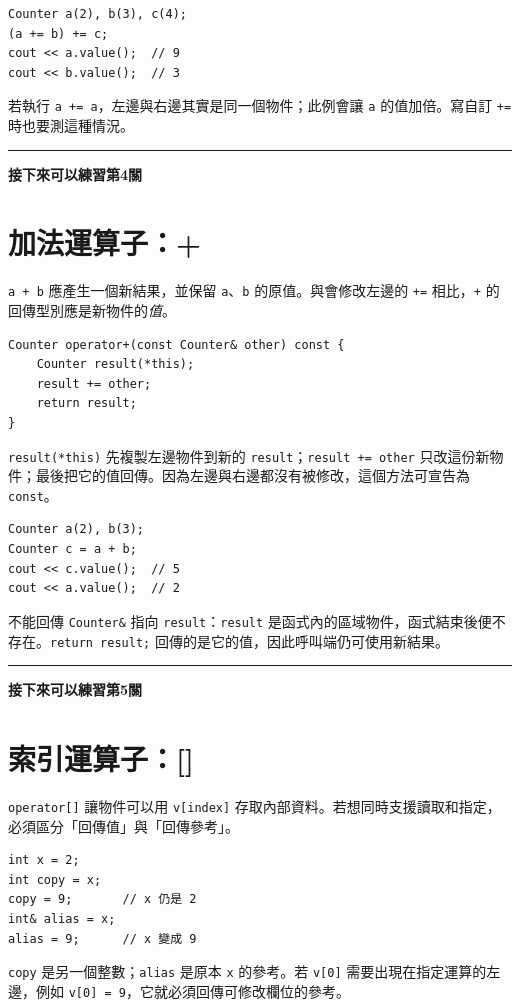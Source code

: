 \documentclass[12pt,a4paper]{article}
\newcommand{\practice}[1]{%
  \Needspace{3\baselineskip}%
  \par\vspace{0.6em}\noindent\rule{\linewidth}{0.3pt}\par
  \noindent\textbf{接下來可以練習第#1關}\par
}
\begin{document}
\begin{lstlisting}
Counter a(2), b(3), c(4);
(a += b) += c;
cout << a.value();  // 9
cout << b.value();  // 3
\end{lstlisting}

若執行 \texttt{a += a}，左邊與右邊其實是同一個物件；此例會讓 \texttt{a} 的值加倍。寫自訂 \texttt{+=} 時也要測這種情況。

\practice{4}

\section{加法運算子：+}

\texttt{a + b} 應產生一個新結果，並保留 \texttt{a}、\texttt{b} 的原值。與會修改左邊的 \texttt{+=} 相比，\texttt{+} 的回傳型別應是新物件的\emph{值}。

\begin{lstlisting}
Counter operator+(const Counter& other) const {
    Counter result(*this);
    result += other;
    return result;
}
\end{lstlisting}

\texttt{result(*this)} 先複製左邊物件到新的 \texttt{result}；\texttt{result += other} 只改這份新物件；最後把它的值回傳。因為左邊與右邊都沒有被修改，這個方法可宣告為 \texttt{const}。

\begin{lstlisting}
Counter a(2), b(3);
Counter c = a + b;
cout << c.value();  // 5
cout << a.value();  // 2
\end{lstlisting}

不能回傳 \texttt{Counter\&} 指向 \texttt{result}：\texttt{result} 是函式內的區域物件，函式結束後便不存在。\texttt{return result;} 回傳的是它的值，因此呼叫端仍可使用新結果。

\practice{5}

\section{索引運算子：[]}

\texttt{operator[]} 讓物件可以用 \texttt{v[index]} 存取內部資料。若想同時支援讀取和指定，必須區分「回傳值」與「回傳參考」。

\begin{lstlisting}
int x = 2;
int copy = x;
copy = 9;       // x 仍是 2
int& alias = x;
alias = 9;      // x 變成 9
\end{lstlisting}

\texttt{copy} 是另一個整數；\texttt{alias} 是原本 \texttt{x} 的參考。若 \texttt{v[0]} 需要出現在指定運算的左邊，例如 \texttt{v[0] = 9}，它就必須回傳可修改欄位的參考。
\end{document}
